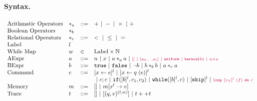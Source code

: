 \documentclass[a4paper,11pt]{article}
\begin{document}
\paragraph{Syntax.}
\[
\begin{array}{llll}
 \mbox{Arithmatic Operators} & *_a & ::= & + ~|~ - ~|~ \times 
%
~|~ \div \\  
  \mbox{Boolean Operators} & *_b & & \\
   \mbox{Relational Operators} & *_r & ::= & < ~|~ \leq ~|~ = \\  
 \mbox{Label} & l & & \\ 
 \mbox{While Map} & w & \in & \mbox{Label} \times \mathbb{N} \\
\mbox{AExpr} & \aexpr & ::= & 
	n ~|~ x ~|~ \aexpr *_a \aexpr ~|~ \jl{[] ~|~ [\aexpr_0, \dots, \aexpr_i] ~|~ \uniform ~|~ \bernoulli ~|~ \aexpr \times \aexpr } \\
\mbox{BExpr} & \bexpr & ::= & 
	\etrue ~|~ \efalse  ~|~ \neg \bexpr
	 ~|~ \bexpr *_b \bexpr
	~|~ \aexpr *_r \aexpr \\
\mbox{Command} & c & ::= &   [\assign x \expr]^{l} ~|~  [\assign x q(\expr)]^{l}
%
 \\
& & & ~|~  c ; c ~|~ \eif([\bexpr]^{l}, c_1, c_2) 
	~|~ \ewhile([\bexpr]^{l}, c) ~|~ [\eskip]^{l} \sep \jl{\eloop ~ [\valr_N]^{l} ~ (f) ~ \edo ~ c }
	\\
\mbox{Memory} & m & ::= & [] ~|~ m[x^{l} \to v] \\
%
\mbox{Trace} & t & ::= & [] ~|~ [(q, v)^{(l, w) }] ~|~ t ++ t
\end{array}
\]
%
%
\end{document}
